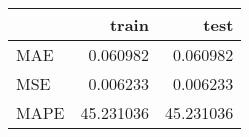 \begin{tabular}{lrr}
\toprule
{} &      train &       test \\
\midrule
MAE  &   0.060982 &   0.060982 \\
MSE  &   0.006233 &   0.006233 \\
MAPE &  45.231036 &  45.231036 \\
\bottomrule
\end{tabular}
